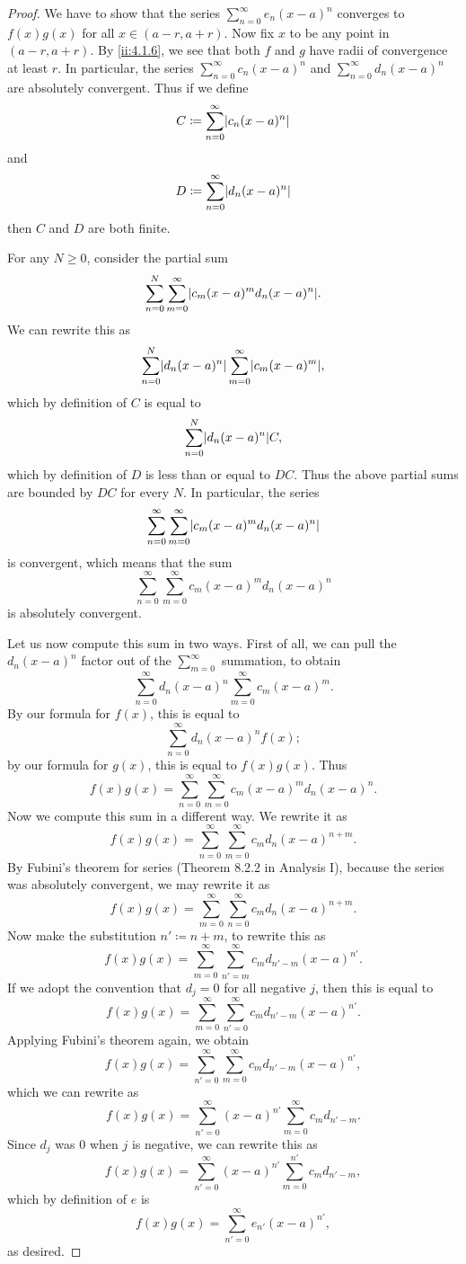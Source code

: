 \begin{proof}
  We have to show that the series \(\sum_{n = 0}^\infty e_n (x - a)^n\) converges to \(f(x) g(x)\) for all \(x \in (a - r, a + r)\).
  Now fix \(x\) to be any point in \((a - r, a + r)\).
  By \cref{ii:4.1.6}, we see that both \(f\) and \(g\) have radii of convergence at least \(r\).
  In particular, the series \(\sum_{n = 0}^\infty c_n (x - a)^n\) and \(\sum_{n = 0}^\infty d_n (x - a)^n\) are absolutely convergent.
  Thus if we define
  \[
    C \coloneqq \sum_{n = 0}^\infty \abs{c_n (x - a)^n}
  \]
  and
  \[
    D \coloneqq \sum_{n = 0}^\infty \abs{d_n (x - a)^n}
  \]
  then \(C\) and \(D\) are both finite.

  For any \(N \geq 0\), consider the partial sum
  \[
    \sum_{n = 0}^N \sum_{m = 0}^\infty \abs{c_m (x - a)^m d_n (x - a)^n}.
  \]
  We can rewrite this as
  \[
    \sum_{n = 0}^N \abs{d_n (x - a)^n} \sum_{m = 0}^\infty \abs{c_m (x - a)^m},
  \]
  which by definition of \(C\) is equal to
  \[
    \sum_{n = 0}^N \abs{d_n (x - a)^n} C,
  \]
  which by definition of \(D\) is less than or equal to \(DC\).
  Thus the above partial sums are bounded by \(DC\) for every \(N\).
  In particular, the series
  \[
    \sum_{n = 0}^\infty \sum_{m = 0}^\infty \abs{c_m (x - a)^m d_n (x - a)^n}
  \]
  is convergent, which means that the sum
  \[
    \sum_{n = 0}^\infty \sum_{m = 0}^\infty c_m (x - a)^m d_n (x - a)^n
  \]
  is absolutely convergent.

  Let us now compute this sum in two ways.
  First of all, we can pull the \(d_n (x - a)^n\) factor out of the \(\sum_{m = 0}^\infty\) summation, to obtain
  \[
    \sum_{n = 0}^\infty d_n (x - a)^n \sum_{m = 0}^\infty c_m (x - a)^m.
  \]
  By our formula for \(f(x)\), this is equal to
  \[
    \sum_{n = 0}^\infty d_n (x - a)^n f(x);
  \]
  by our formula for \(g(x)\), this is equal to \(f(x) g(x)\).
  Thus
  \[
    f(x) g(x) = \sum_{n = 0}^\infty \sum_{m = 0}^\infty c_m (x - a)^m d_n (x - a)^n.
  \]
  Now we compute this sum in a different way.
  We rewrite it as
  \[
    f(x) g(x) = \sum_{n = 0}^\infty \sum_{m = 0}^\infty c_m d_n (x - a)^{n + m}.
  \]
  By Fubini's theorem for series (Theorem 8.2.2 in Analysis I), because the series was absolutely convergent, we may rewrite it as
  \[
    f(x) g(x) = \sum_{m = 0}^\infty \sum_{n = 0}^\infty c_m d_n (x - a)^{n + m}.
  \]
  Now make the substitution \(n' \coloneqq n + m\), to rewrite this as
  \[
    f(x) g(x) = \sum_{m = 0}^\infty \sum_{n' = m}^\infty c_m d_{n' - m} (x - a)^{n'}.
  \]
  If we adopt the convention that \(d_j = 0\) for all negative \(j\), then this is equal to
  \[
    f(x) g(x) = \sum_{m = 0}^\infty \sum_{n' = 0}^\infty c_m d_{n' - m} (x - a)^{n'}.
  \]
  Applying Fubini's theorem again, we obtain
  \[
    f(x) g(x) = \sum_{n' = 0}^\infty \sum_{m = 0}^\infty c_m d_{n' - m} (x - a)^{n'},
  \]
  which we can rewrite as
  \[
    f(x) g(x) = \sum_{n' = 0}^\infty (x - a)^{n'} \sum_{m = 0}^\infty c_m d_{n' - m}.
  \]
  Since \(d_j\) was \(0\) when \(j\) is negative, we can rewrite this as
  \[
    f(x) g(x) = \sum_{n' = 0}^\infty (x - a)^{n'} \sum_{m = 0}^{n'} c_m d_{n' - m},
  \]
  which by definition of \(e\) is
  \[
    f(x) g(x) = \sum_{n' = 0}^\infty e_{n'} (x - a)^{n'},
  \]
  as desired.
\end{proof}

